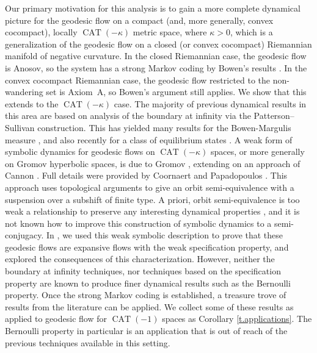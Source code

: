\documentclass[11pt]{article}
\theoremstyle{definition}
\numberwithin{equation}{section}
\DeclareMathOperator{\CAT}{CAT}
\begin{document}
Our primary motivation for this analysis is to gain a more complete dynamical picture for the geodesic flow on a compact (and, more generally, convex cocompact), locally $\CAT(-\kappa)$ metric space, where $\kappa>0$, which is a generalization of the geodesic flow on a closed (or convex cocompact) Riemannian manifold of negative curvature. In the closed Riemannian case, the geodesic flow is Anosov, so the system has a strong Markov coding by Bowen's results \cite{bowen-symbolic}. In the convex cocompact Riemannian case, the geodesic flow restricted to the non-wandering set is Axiom~A, so Bowen's argument still applies. We show that this extends to the $\CAT(-\kappa)$ case. The majority of previous dynamical results in this area are based on analysis of the boundary at infinity via the Patterson--Sullivan construction. This has yielded many results for the Bowen-Margulis measure \cite{Roblin}, and also recently for a class of equilibrium states \cite{BPP16}. A weak form of symbolic dynamics for geodesic flows on $\CAT(-\kappa)$ spaces, or more generally on Gromov hyperbolic spaces, is due to Gromov \cite{gromov}, extending on an approach of Cannon \cite{Cannon}. Full details were provided by Coornaert and Papadopoulos \cite{cp}. This approach uses topological arguments to give an orbit semi-equivalence with a suspension over a subshift of finite type. A priori, orbit semi-equivalence is too weak a relationship to preserve any interesting dynamical properties \cite{GM, KT17}, and it is not known how to improve this construction of symbolic dynamics to a semi-conjugacy. In \cite{CLT}, we used this weak symbolic description to prove that these geodesic flows are expansive flows with the weak specification property, and explored the consequences of this characterization. However, neither the boundary at infinity techniques, nor techniques based on the specification property are known to produce finer dynamical results such as the Bernoulli property. Once the strong Markov coding is established, a treasure trove of results from the literature can be applied. We collect some of these results as applied to geodesic flow for $\CAT(-1)$ spaces as Corollary \ref{t.applications}. The Bernoulli property in particular is an application that is out of reach of the previous techniques available in this setting.
\end{document}
